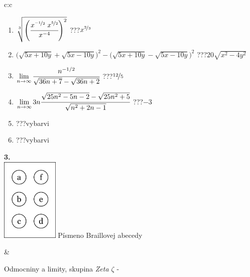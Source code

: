 \documentclass[10pt]{report}
\begin{document}
\begin{tabular}{c:c}
\begin{minipage}[c][104.5mm][t]{0.5\linewidth}
\begin{center}
\begin{minipage}{0.79\linewidth}
\begin{center}
\begin{varwidth}{\linewidth}
\begin{enumerate}
\small
\item $\sqrt[3]{\left(\cfrac{x^{\nicefrac{-1}{2}}\;x^{\nicefrac{5}{2}}}{x^{-4}}\right)^{2}}$\quad \dotfill\; ???\;\dotfill \quad $x^{\nicefrac{2}{3}}$
\item {\footnotesize{\scriptsize$\big(\sqrt{5x+10y}+\sqrt{5x-10y}\big)^2-\big(\sqrt{5x+10y}-\sqrt{5x-10y}\big)^2$}\quad \dotfill\; ???\;\dotfill \quad $20\sqrt{x^2-4y^2}$}
\item $\lim\limits_{n\to\infty}\cfrac{n^{-1/2}}{\sqrt{36n+7}-\sqrt{36n+2}}$\quad \dotfill\; ???\;\dotfill \quad $\nicefrac{12}{5}$
\item $\lim\limits_{n\to\infty}3n\cfrac{\sqrt{25n^2-5n-2}-\sqrt{25n^2+5}}{\sqrt{n^2+2n-1}}$\quad \dotfill\; ???\;\dotfill \quad $-3$
\item \quad \dotfill\; ???\;\dotfill \quad vybarvi
\item \quad \dotfill\; ???\;\dotfill \quad vybarvi
\end{enumerate}
\end{varwidth}
\end{center}
\end{minipage}
\begin{minipage}{0.20\linewidth}
\begin{center}
{\Huge\bfseries 3.} \\[2mm]
\includegraphics[height=40mm]{../images/braille.png}
{\small Písmeno Braillovej abecedy}
\end{center}
\end{minipage}
\end{center}
\end{minipage}
&
\begin{minipage}[c][104.5mm][t]{0.5\linewidth}
\begin{center}
\vspace{7mm}
{\huge Odmocniny a limity, skupina \textit{Zeta $\zeta$} -}\\[5mm]

\end{center}
\end{minipage}
\end{tabular}
\end{document}
